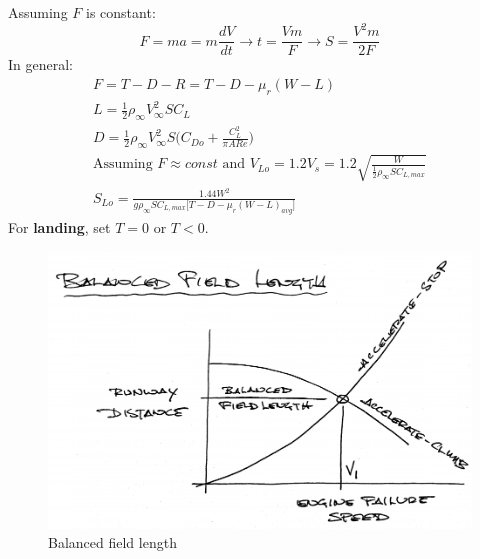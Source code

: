 \documentclass[draft=false, titlepage]{article}
\begin{document}
Assuming $F$ is constant:
\begin{equation*}
F = ma = m\frac{dV}{dt} \rightarrow t = \frac{Vm}{F} \rightarrow S = \frac{V^2 m}{2F}
\end{equation*}
In general:
\begin{gather*}
F = T-D-R = T-D-\mu_r(W-L)\\
L = \frac{1}{2}\rho_\infty V_\infty^2 S C_L\\
D = \frac{1}{2} \rho_\infty V_\infty^2 S \big(C_{Do} + \frac{C_L^2}{\pi AR e}\big)\\
\text{Assuming } F \approx const \text{ and } V_{Lo} = 1.2V_s = 1.2\sqrt{\frac{W}{\frac{1}{2}\rho_\infty S C_{L,max}}}\\
S_{Lo} = \frac{1.44 W^2}{ g\rho_\infty S C_{L,max} \big[ T-D-\mu_r (W-L)_{avg} \big] }
\end{gather*}
For \textbf{landing}, set $T=0$ or $T<0$.

\begin{figure}[ht]
	\centering
	\includegraphics[width=0.8\linewidth]{Figures/p100_fieldLength.PNG}
	\caption{Balanced field length}
	\label{fig:p100_fieldLength}
\end{figure}
\end{document}

